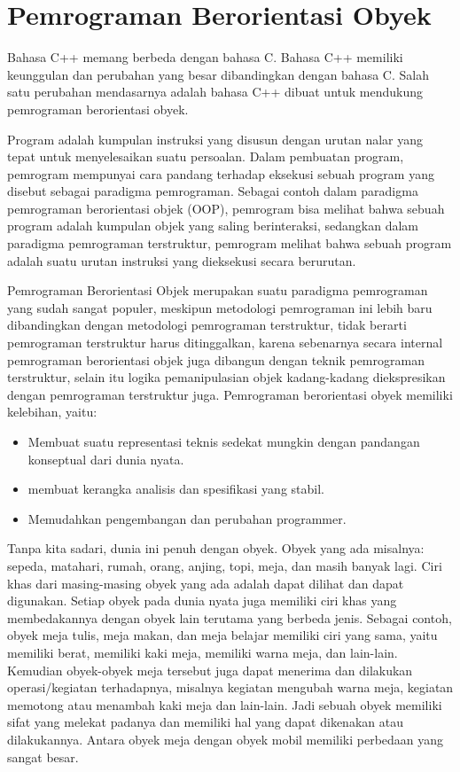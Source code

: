 
\section{Pemrograman Berorientasi
Obyek}\label{pemrograman-berorientasi-obyek}

Bahasa C++ memang berbeda dengan bahasa C. Bahasa C++ memiliki
keunggulan dan perubahan yang besar dibandingkan dengan bahasa C. Salah
satu perubahan mendasarnya adalah bahasa C++ dibuat untuk mendukung
pemrograman berorientasi obyek.

Program adalah kumpulan instruksi yang disusun dengan urutan nalar yang
tepat untuk menyelesaikan suatu persoalan. Dalam pembuatan program,
pemrogram mempunyai cara pandang terhadap eksekusi sebuah program yang
disebut sebagai paradigma pemrograman. Sebagai contoh dalam paradigma
pemrograman berorientasi objek (OOP), pemrogram bisa melihat bahwa
sebuah program adalah kumpulan objek yang saling berinteraksi, sedangkan
dalam paradigma pemrograman terstruktur, pemrogram melihat bahwa sebuah
program adalah suatu urutan instruksi yang dieksekusi secara berurutan.

Pemrograman Berorientasi Objek merupakan suatu paradigma pemrograman
yang sudah sangat populer, meskipun metodologi pemrograman ini lebih
baru dibandingkan dengan metodologi pemrograman terstruktur, tidak
berarti pemrograman terstruktur harus ditinggalkan, karena sebenarnya
secara internal pemrograman berorientasi objek juga dibangun dengan
teknik pemrograman terstruktur, selain itu logika pemanipulasian objek
kadang-kadang diekspresikan dengan pemrograman terstruktur juga.
Pemrograman berorientasi obyek memiliki kelebihan, yaitu:

\begin{itemize}
\tightlist
\item
  Membuat suatu representasi teknis sedekat mungkin dengan pandangan
  konseptual dari dunia nyata.
\item
  membuat kerangka analisis dan spesifikasi yang stabil.
\item
  Memudahkan pengembangan dan perubahan programmer.
\end{itemize}

Tanpa kita sadari, dunia ini penuh dengan obyek. Obyek yang ada
misalnya: sepeda, matahari, rumah, orang, anjing, topi, meja, dan masih
banyak lagi. Ciri khas dari masing-masing obyek yang ada adalah dapat
dilihat dan dapat digunakan. Setiap obyek pada dunia nyata juga memiliki
ciri khas yang membedakannya dengan obyek lain terutama yang berbeda
jenis. Sebagai contoh, obyek meja tulis, meja makan, dan meja belajar
memiliki ciri yang sama, yaitu memiliki berat, memiliki kaki meja,
memiliki warna meja, dan lain-lain. Kemudian obyek-obyek meja tersebut
juga dapat menerima dan dilakukan operasi/kegiatan terhadapnya, misalnya
kegiatan mengubah warna meja, kegiatan memotong atau menambah kaki meja
dan lain-lain. Jadi sebuah obyek memiliki sifat yang melekat padanya dan
memiliki hal yang dapat dikenakan atau dilakukannya. Antara obyek meja
dengan obyek mobil memiliki perbedaan yang sangat besar.

